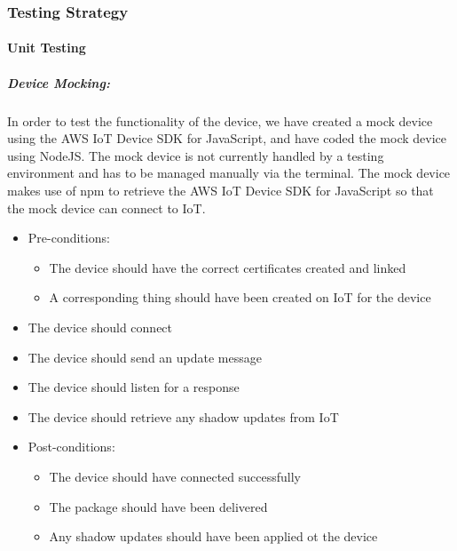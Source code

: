 \documentclass{article}
\begin{document}
		\subsubsection{Testing Strategy}
			\paragraph{Unit Testing}
				\subparagraph{Device Mocking:}
				In order to test the functionality of the device, we have created a mock device using the AWS IoT Device SDK for JavaScript, and have coded the mock device using NodeJS. The mock device is not currently handled by a testing environment and has to be managed manually via the terminal. The mock device makes use of npm to retrieve the AWS IoT Device SDK for JavaScript so that the mock device can connect to IoT.
				\begin{itemize}
					\item Pre-conditions:
						\begin{itemize}
							\item The device should have the correct certificates created and linked
							\item A corresponding thing should have been created on IoT for the device
						\end{itemize}
					\item The device should connect
					\item The device should send an update message
					\item The device should listen for a response
					\item The device should retrieve any shadow updates from IoT
					\item Post-conditions:
						\begin{itemize}
							\item The device should have connected successfully
							\item The package should have been delivered 
							\item Any shadow updates should have been applied ot the device
						\end{itemize}
				\end{itemize}
				
\end{document}
